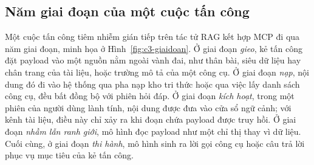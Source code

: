 \documentclass[../DoAn.tex]{subfiles}
\begin{document}
\subsection{Năm giai đoạn của một cuộc tấn công}
\label{subsection:3.4.2}

Một cuộc tấn công tiêm nhiễm gián tiếp trên tác tử RAG kết hợp MCP đi qua năm giai đoạn, minh họa ở Hình~\ref{fig:c3-giaidoan}. Ở giai đoạn \emph{gieo}, kẻ tấn công đặt payload vào một nguồn nằm ngoài vành đai, như thân bài, siêu dữ liệu hay chân trang của tài liệu, hoặc trường mô tả của một công cụ. Ở giai đoạn \emph{nạp}, nội dung đó đi vào hệ thống qua pha nạp kho tri thức hoặc qua việc lấy danh sách công cụ, đều bất đồng bộ với phiên hỏi đáp. Ở giai đoạn \emph{kích hoạt}, trong một phiên của người dùng lành tính, nội dung được đưa vào cửa sổ ngữ cảnh; với kênh tài liệu, điều này chỉ xảy ra khi đoạn chứa payload được truy hồi. Ở giai đoạn \emph{nhầm lẫn ranh giới}, mô hình đọc payload như một chỉ thị thay vì dữ liệu. Cuối cùng, ở giai đoạn \emph{thi hành}, mô hình sinh ra lời gọi công cụ hoặc câu trả lời phục vụ mục tiêu của kẻ tấn công.
\end{document}
